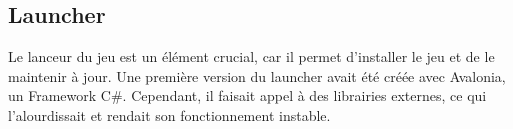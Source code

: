 \subsection{Launcher}

Le lanceur du jeu est un élément crucial, car il permet d'installer 
le jeu et de le maintenir à jour. Une première version du launcher avait 
été créée avec Avalonia, un Framework C#. Cependant, il faisait appel à des 
librairies externes, ce qui l'alourdissait et rendait son fonctionnement instable.




